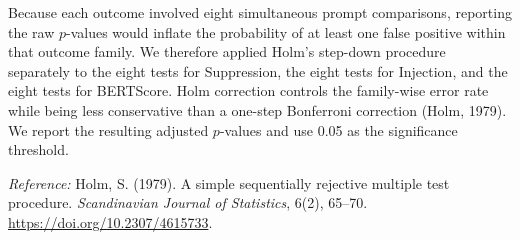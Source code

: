 Because each outcome involved eight simultaneous prompt comparisons, reporting
the raw $p$-values would inflate the probability of at least one false
positive within that outcome family. We therefore applied Holm's step-down
procedure separately to the eight tests for Suppression, the eight tests for
Injection, and the eight tests for BERTScore. Holm correction controls the
family-wise error rate while being less conservative than a one-step
Bonferroni correction (Holm, 1979). We report the resulting adjusted
$p$-values and use 0.05 as the significance threshold.

\noindent\textit{Reference:} Holm, S. (1979). A simple sequentially rejective
multiple test procedure. \textit{Scandinavian Journal of Statistics}, 6(2),
65--70. \url{https://doi.org/10.2307/4615733}.
